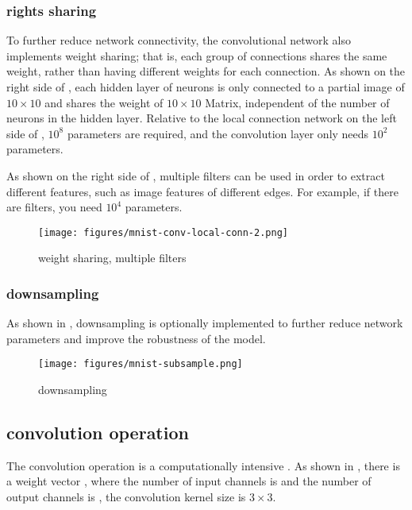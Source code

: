 \begin{content}
\begin{content}
\subsubsection{rights sharing}

To further reduce network connectivity, the convolutional network also implements weight sharing; that is, each group of connections shares the same weight, rather than having different weights for each connection. As shown on the right side of , each hidden layer of neurons is only connected to a partial image of $10\times 10 $ and shares the weight of $ 10 \times 10 $ Matrix, independent of the number of neurons in the hidden layer. Relative to the local connection network on the left side of , $10^8$ parameters are required, and the convolution layer only needs $10^2$ parameters.

As shown on the right side of , multiple filters can be used in order to extract different features, such as image features of different edges. For example, if there are  filters, you need $10^4$ parameters.

\begin{figure}[H]
\centering
\texttt{[image: figures/mnist-conv-local-conn-2.png]}
\caption{weight sharing, multiple filters}
 \label{fig:mnist-conv-local-conn-2}
\end{figure}

\subsubsection{downsampling}

As shown in , downsampling is optionally implemented to further reduce network parameters and improve the robustness of the model.

\begin{figure}[H]
\centering
\texttt{[image: figures/mnist-subsample.png]}
\caption{downsampling}
 \label{fig:mnist-subsample}
\end{figure}

\subsection{convolution operation}

The convolution operation is a computationally intensive . As shown in , there is a weight vector , where the number of input channels is  and the number of output channels is , the convolution kernel size is $3 \times 3$.


\end{content}
\end{content}
